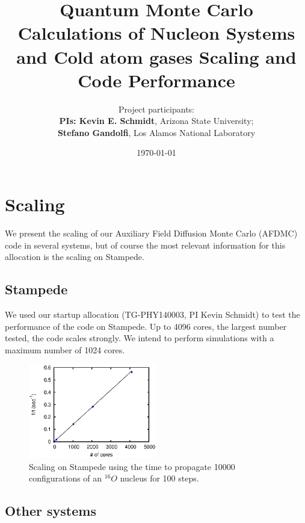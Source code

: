 \documentclass[12pt,letterpaper]{article}
\newcommand{\project}{\large Quantum Monte Carlo Calculations of Nucleon Systems and Cold atom gases \vskip 0.5cm}
\begin{document}
\onehalfspacing
\title{\project {\Large \textbf{Scaling and Code Performance}} \vspace{0cm}}
\author{
Project participants:\\
{\bf PIs: Kevin E. Schmidt}, Arizona State University; \\
{\bf Stefano Gandolfi}, Los Alamos National Laboratory\\
}
\date{\today}
\maketitle
\section{Scaling}
We present the scaling of our Auxiliary Field Diffusion Monte Carlo (AFDMC) code in several systems, but of course the 
most relevant information for this allocation is the scaling on Stampede.

\subsection{Stampede}

We used our startup allocation (TG-PHY140003, PI Kevin Schmidt) to test the 
performance of the code on Stampede. Up to 4096 cores, the 
largest number tested, the code scales strongly. We intend to perform 
simulations with a maximum number of 1024 cores.

\begin{figure}[h]
   \centering
   \includegraphics[width=0.5\textwidth]{stampede}
   \caption{Scaling on Stampede using the time to propagate 10000 configurations of an $^{16}O$ nucleus for 100 steps.}
   \label{fig:scaling}
\end{figure}

\subsection{Other systems}
\end{document}

